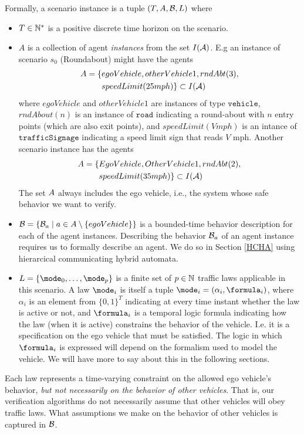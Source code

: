 Formally, a scenario instance is a tuple $(T, A,\mathcal{B}, L)$ where
\begin{itemize}
\item $T \in \mathbb{N}^*$ is a positive discrete time horizon on the scenario.
%
\item $A$ is a collection of agent \emph{instances} from the set $I(\mathcal{A})$.
E.g an instance of scenario $s_0$ (Roundabout) might have the agents 
\begin{eqnarray*}
A = \{&egoVehicle, otherVehicle1, rndAbt(3), \\ 
& speedLimit(25mph)\} \subset I(\mathcal{A})
\end{eqnarray*}
where $egoVehicle$ and $otherVehicle1$ are instances of type $\texttt{vehicle}$, 
$rndAbout(n)$ is an instance of $\texttt{road}$ indicating a round-about with $n$ entry points (which are also exit points),
and $speedLimit(Vmph)$ is an intance of $\texttt{trafficSignage}$ indicating a speed limit sign that reads $V$ mph.
Another scenario instance has the agents
\begin{eqnarray*}
A = \{&EgoVehicle, OtherVehicle1, rndAbt(2), \\ 
& speedLimit(35mph)\} \subset I(\mathcal{A})
\end{eqnarray*}
The set $A$ always includes the ego vehicle, i.e., the system whose safe behavior we want to verify.
%
\item $\mathcal{B} = \{\mathcal{B}_a \;|\; a \in A \setminus \{egoVehicle\}\}$ is a bounded-time behavior description for each of the agent instances.
Describing the behavior $\mathcal{B}_a$ of an agent instance requires us to formally describe an agent. We do so in Section \ref{HCHA} using hierarcical communicating hybrid automata.
%
\item $L = \{\mode_0,\ldots,\mode_p\}$ is a finite set of $p \in \mathbb{N}$ traffic laws applicable in this scenario. 
A law $\mode_i$ is itself a tuple $\mode_i = (\alpha_i,\formula_i)$, 
where $\alpha_i$ is an element from $\{0,1\}^T$ indicating at every time instant whether the law is active or not, 
and $\formula_i$ is a temporal logic formula indicating how the law (when it is active) constrains the behavior of the vehicle. 
I.e. it is a specification on the ego vehicle that must be satisfied. 
The logic in which $\formula_i$ is expressed will depend on the formalism used to model the vehicle. 
We will have more to say about this in the following sections.
\end{itemize}

Each law represents a time-varying constraint on the allowed ego vehicle's behavior, \emph{but not necessarily on the behavior of other vehicles}.
That is, our verification algorithms do not necessarily assume that other vehicles will obey traffic laws. 
What assumptions we make on the behavior of other vehicles is captured in $\mathcal{B}$.

